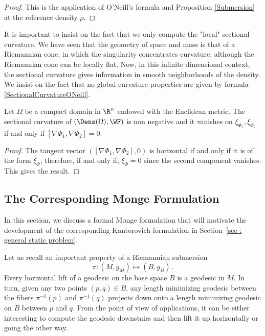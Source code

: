 \begin{proof}
This is the application of O'Neill's formula \cite[Corollary 6.2]{Lang1999} and Proposition \ref{Submersion} at the reference density $\rho$.
\end{proof}

\begin{remark}
 It is important to insist on the fact that we only compute the "local" sectional curvature. We have seen that the geometry of space and mass is that of a Riemannian cone, in which the singularity concentrates curvature, although the Riemannian cone can be locally flat. Now, in this infinite dimensional context, the sectional curvature gives information in smooth neighborhoods of the density. %
We insist on the fact that no global curvature properties are given by formula \eqref{SectionalCurvatureONeill}.
 \end{remark}


\begin{corollary}
Let $\Omega$ be a compact domain in $\R^n$ endowed with the Euclidean metric.
The sectional curvature of $(\Dens(\Omega),\WF)$ is non negative and it vanishes on $\xi_{\Phi_1},\xi_{\Phi_2}$ if and only if $ [\nabla \Phi_1,\nabla \Phi_2]=0$.
\end{corollary}

\begin{proof}
The tangent vector $\left( [\nabla \Phi_1,\nabla \Phi_2] ,0 \right)$ is horizontal if and only if it is of the form $\xi_\Phi$, therefore, if and only if, $\xi_\Phi =0$ since the second component vanishes. This gives the result.
\end{proof}
\subsection{The Corresponding Monge Formulation} \label{Monge}

In this section, we discuss a formal Monge formulation that will motivate the development of the corresponding Kantorovich formulation in Section~\ref{sec : general static problem}.
 
Let us recall an important property of a Riemannian submersion $$\pi: (M,g_M) \mapsto (B,g_B)\,.$$ Every horizontal lift of a geodesic on the base space $B$ is a geodesic in $M$. In turn, given any two points $(p,q) \in B$, any length minimizing geodesic between the fibers $\pi^{-1}(p)$ and $\pi^{-1}(q)$ projects down onto a length minimizing geodesic on $B$ between $p$ and $q$. From the point of view of applications, it can be either interesting to compute the geodesic downstairs and then lift it up horizontally or going the other way.

